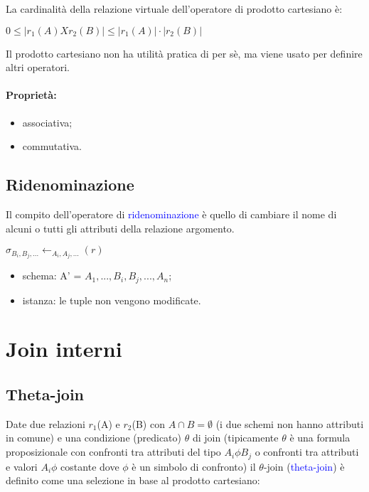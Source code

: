 La cardinalità della relazione virtuale dell'operatore di prodotto cartesiano è: 

$0 \leq |r_1(A) X r_2(B)| \leq |r_1(A)| \cdot |r_2(B)|$

Il prodotto cartesiano non ha utilità pratica di per sè, ma viene usato per definire altri operatori.

\paragraph{Proprietà:} 
\begin{itemize}
    \item associativa;
    \item commutativa.
\end{itemize}

\subsection[\texorpdfstring{\\}{ }Ridenominazione]{Ridenominazione}

Il compito dell'operatore di \textcolor{blue}{ridenominazione} è quello di cambiare il nome di alcuni o tutti gli attributi della relazione argomento. 

$\sigma_{B_i, B_j, ...} \leftarrow  _{A_i, A_j, ...}(r)$

\begin{itemize}
    \item schema: A' = ${A_1, ..., B_i, B_j, ..., A_n}$;
    \item istanza: le tuple non vengono modificate.
\end{itemize}

\section{Join interni}
\label{Join i}
\subsection{Theta-join}

Date due relazioni $r_1$(A) e $r_2$(B) con $A \cap B = \emptyset$ (i due schemi non hanno attributi in comune) e una condizione (predicato) $\theta$ di join (tipicamente $\theta$ è una formula proposizionale con confronti tra attributi del tipo $A_i \phi B_j$ o confronti tra attributi e valori $A_i \phi$ costante dove $\phi$ è un simbolo di confronto) il $\theta$-join (\textcolor{blue}{theta-join}) è definito come una selezione in base al prodotto cartesiano:

